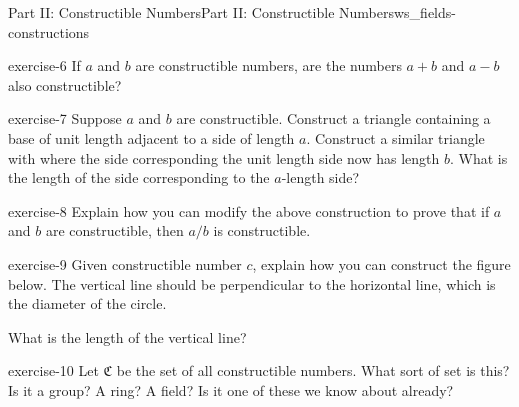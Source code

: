 \documentclass[oneside,11pt,]{article}
\begin{document}
\begin{worksheet-section-numberless}{Part II: Constructible Numbers}{}{Part II: Constructible Numbers}{}{}{ws_fields-constructions}
\begin{divisionexercise}{2}{}{}{exercise-6}
\hypertarget{p-26}{}%
If \(a\) and \(b\) are constructible numbers, are the numbers \(a+b\) and \(a-b\) also constructible?%
\end{divisionexercise}%
\begin{divisionexercise}{3}{}{}{exercise-7}%
\hypertarget{p-27}{}%
Suppose \(a\) and \(b\) are constructible.  Construct a triangle containing a base of unit length adjacent to a side of length \(a\).  Construct a similar triangle with where the side corresponding the unit length side now has length \(b\).  What is the length of the side corresponding to the \(a\)-length side?%
\begin{figure}
\end{figure}\end{divisionexercise}%
\begin{divisionexercise}{4}{}{}{exercise-8}%
\hypertarget{p-29}{}%
Explain how you can modify the above construction to prove that if \(a\) and \(b\) are constructible, then \(a/b\) is constructible.%
\end{divisionexercise}%
\begin{divisionexercise}{5}{}{}{exercise-9}%
\hypertarget{p-31}{}%
Given constructible number \(c\), explain how you can construct the figure below.  The vertical line should be perpendicular to the horizontal line, which is the diameter of the circle.%
\begin{figure}
\end{figure}\hypertarget{p-32}{}%
What is the length of the vertical line?%
\end{divisionexercise}%
\begin{divisionexercise}{6}{}{}{exercise-10}%
\hypertarget{p-34}{}%
Let \(\mathfrak C\) be the set of all constructible numbers.  What sort of set is this?  Is it a group?  A ring?  A field?  Is it one of these we know about already?%
\end{divisionexercise}%
\end{worksheet-section-numberless}
\restoregeometry
\end{document}
